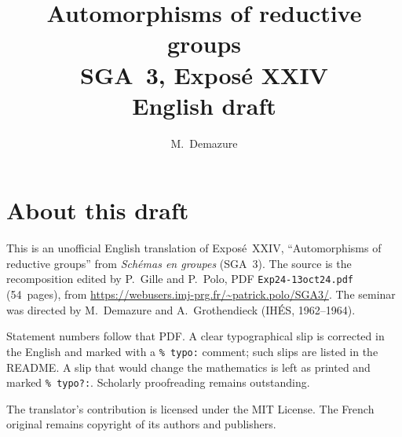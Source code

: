 \documentclass[11pt,a4paper,oneside]{amsbook}
\title[SGA~3, Expos\'e XXIV (English draft)]{Automorphisms of reductive groups\\
{\normalsize SGA~3, Expos\'e XXIV\\English draft}}
\author{M.\ Demazure}
\date{}
\begin{document}
\frontmatter
\maketitle

\chapter*{About this draft}
This is an unofficial English translation of Expos\'e~XXIV, ``Automorphisms of reductive groups''
from \textit{Sch\'emas en groupes} (SGA~3).
The source is the recomposition edited by P.~Gille and P.~Polo,
PDF \texttt{Exp24-13oct24.pdf} (54~pages),
from \url{https://webusers.imj-prg.fr/~patrick.polo/SGA3/}.
The seminar was directed by M.~Demazure and A.~Grothendieck
(IH\'ES, 1962--1964).

Statement numbers follow that PDF. A clear typographical slip is
corrected in the English and marked with a \texttt{\% typo:} comment;
such slips are listed in the README. A slip that would change the
mathematics is left as printed and marked \texttt{\% typo?:}.
Scholarly proofreading remains outstanding.

The translator's contribution is licensed under the MIT License.
The French original remains copyright of its authors and publishers.

\tableofcontents
\mainmatter








\end{document}
